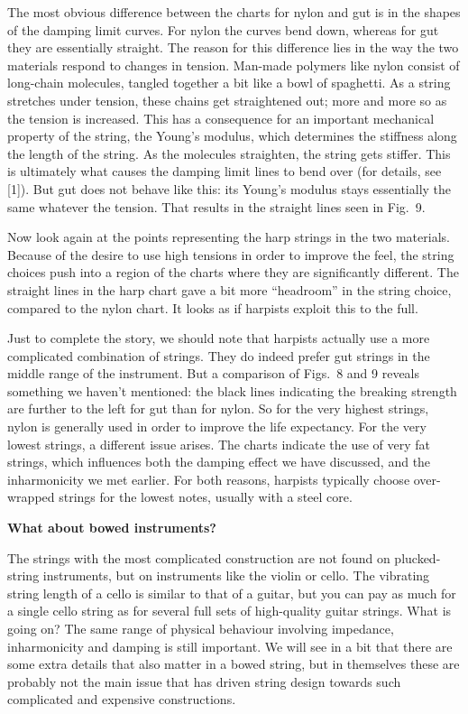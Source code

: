   The most obvious difference between the charts for nylon and gut is in the 
  shapes of the damping limit curves. For nylon the curves bend down, whereas 
  for gut they are essentially straight. The reason for this difference lies in 
  the way the two materials respond to changes in tension. Man-made polymers 
  like nylon consist of long-chain molecules, tangled together a bit like a 
  bowl of spaghetti. As a string stretches under tension, these chains get 
  straightened out; more and more so as the tension is increased. This has a 
  consequence for an important mechanical property of the string, the Young's 
  modulus, which determines the stiffness along the length of the string. As 
  the molecules straighten, the string gets stiffer. This is ultimately what 
  causes the damping limit lines to bend over (for details, see [1]). But gut 
  does not behave like this: its Young's modulus stays essentially the same 
  whatever the tension. That results in the straight lines seen in Fig.\ 9. 

  Now look again at the points representing the harp strings in the two 
  materials. Because of the desire to use high tensions in order to improve the 
  feel, the string choices push into a region of the charts where they are 
  significantly different. The straight lines in the harp chart gave a bit more 
  ``headroom'' in the string choice, compared to the nylon chart. It looks as 
  if harpists exploit this to the full. 

  Just to complete the story, we should note that harpists actually use a more 
  complicated combination of strings. They do indeed prefer gut strings in the 
  middle range of the instrument. But a comparison of Figs.\ 8 and 9 reveals 
  something we haven't mentioned: the black lines indicating the breaking 
  strength are further to the left for gut than for nylon. So for the very 
  highest strings, nylon is generally used in order to improve the life 
  expectancy. For the very lowest strings, a different issue arises. The charts 
  indicate the use of very fat strings, which influences both the damping 
  effect we have discussed, and the inharmonicity we met earlier. For both 
  reasons, harpists typically choose over-wrapped strings for the lowest notes, 
  usually with a steel core. 

  \textbf{What about bowed instruments?} 

  The strings with the most complicated construction are not found on 
  plucked-string instruments, but on instruments like the violin or cello. The 
  vibrating string length of a cello is similar to that of a guitar, but you 
  can pay as much for a single cello string as for several full sets of 
  high-quality guitar strings. What is going on? The same range of physical 
  behaviour involving impedance, inharmonicity and damping is still important. 
  We will see in a bit that there are some extra details that also matter in a 
  bowed string, but in themselves these are probably not the main issue that 
  has driven string design towards such complicated and expensive 
  constructions. 

